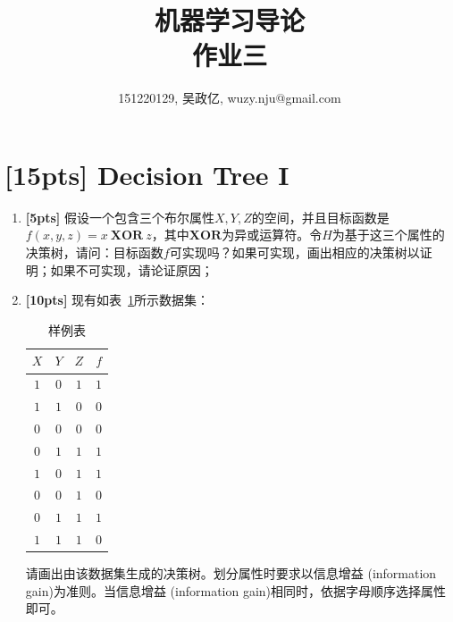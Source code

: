 \documentclass[a4paper,UTF8]{article}
\numberwithin{equation}{section}
\begin{document}
\title{机器学习导论\\
作业三}
\author{151220129, 吴政亿, wuzy.nju@gmail.com}
\maketitle



\section{[15pts] Decision Tree I}

\begin{enumerate}[ {(}1{)}]
	\item \textbf{[5pts]} 假设一个包含三个布尔属性${X, Y, Z}$的空间，并且目标函数是$f(x,y,z) = x\ \mathbf{XOR}\ z$，其中$\mathbf{XOR}$为异或运算符。令$H$为基于这三个属性的决策树，请问：目标函数$f$可实现吗？如果可实现，画出相应的决策树以证明；如果不可实现，请论证原因；
	
	\item \textbf{[10pts]} 现有如表~\ref{table:ranking}所示数据集：
	
	\begin{table}[!h]
		\centering
		\caption{样例表} \vspace{2mm}\label{table:ranking}
		\begin{tabular}{c c c|c}\hline
			$X$ & $Y$ & $Z$ & $f$ \\
			\hline
			$1$ & $0$  & $1$ &  $1$\\
			$1$ & $1$  & $0$ &  $0$\\
			$0$ & $0$  & $0$ &  $0$\\
			$0$ & $1$  & $1$ &  $1$\\
			$1$ & $0$  & $1$ &  $1$\\
			$0$ & $0$  & $1$ &  $0$\\
			$0$ & $1$  & $1$ &  $1$\\
			$1$ & $1$  & $1$ &  $0$\\
			\hline
		\end{tabular}
	\end{table}
	
	请画出由该数据集生成的决策树。划分属性时要求以信息增益 (information gain)为准则。当信息增益 (information gain)相同时，依据字母顺序选择属性即可。
\end{enumerate}
\end{document}
